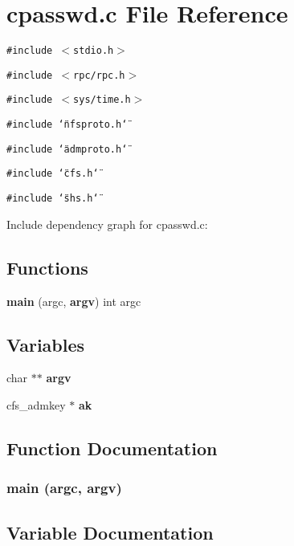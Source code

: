 \section{cpasswd.c File Reference}
\label{cpasswd_8c}


{\tt \#include $<$stdio.h$>$}\par
{\tt \#include $<$rpc/rpc.h$>$}\par
{\tt \#include $<$sys/time.h$>$}\par
{\tt \#include \char`\"{}nfsproto.h\char`\"{}}\par
{\tt \#include \char`\"{}admproto.h\char`\"{}}\par
{\tt \#include \char`\"{}cfs.h\char`\"{}}\par
{\tt \#include \char`\"{}shs.h\char`\"{}}\par


Include dependency graph for cpasswd.c:\subsection*{Functions}
\begin{CompactItemize}
\item 
{\bf main} (argc, {\bf argv}) int argc
\end{CompactItemize}
\subsection*{Variables}
\begin{CompactItemize}
\item 
char $\ast$$\ast$ {\bf argv}
\item 
cfs\_\-admkey $\ast$ {\bf ak}
\end{CompactItemize}


\subsection{Function Documentation}
\subsubsection{\setlength{\rightskip}{0pt plus 5cm}main (argc, {\bf argv})}\label{cpasswd_8c_a2}




\subsection{Variable Documentation}
